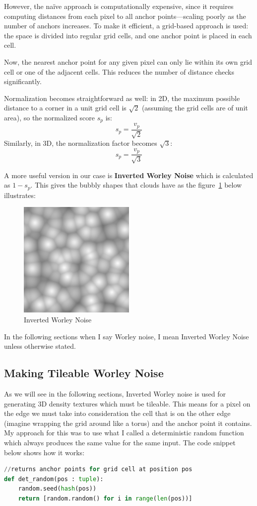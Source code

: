 However, the naïve approach is computationally expensive, since it requires computing distances from each pixel to all anchor points—scaling poorly as the number of anchors increases. To make it efficient, a grid-based approach is used: the space is divided into regular grid cells, and one anchor point is placed in each cell.

Now, the nearest anchor point for any given pixel can only lie within its own grid cell or one of the adjacent cells. This reduces the number of distance checks significantly.

Normalization becomes straightforward as well: in 2D, the maximum possible distance to a corner in a unit grid cell is $\sqrt{2}$ (assuming the grid cells are of unit area), so the normalized score $s_p$ is:
\[
s_p = \frac{v_p}{\sqrt{2}}
\]
Similarly, in 3D, the normalization factor becomes $\sqrt{3}$:
\[
s_p = \frac{v_p}{\sqrt{3}}
\]

A more useful version in our case is \textbf{Inverted Worley Noise} which is calculated as $1 - s_p$. This gives the bubbly shapes that clouds have as the figure~\ref{fig:inverted_worley} below illustrates:
\begin{figure}[H]
    \centering
    \includegraphics[width=0.5\textwidth]{images/inverted_worley.png}
    \caption{Inverted Worley Noise}
    \label{fig:inverted_worley}
\end{figure}

In the following sections when I say Worley noise, I mean Inverted Worley Noise unless otherwise stated.

\subsection{Making Tileable Worley Noise}
As we will see in the following sections, Inverted Worley noise is used for generating 3D density textures which must be tileable. This means for a pixel on the edge we must take into consideration the cell that is on the other edge (imagine wrapping the grid around like a torus) and the anchor point it contains. My approach for this was to use what I called a deterministic random function which always produces the same value for the same input. The code snippet below shows how it works:
\begin{lstlisting}[language=Python]
//returns anchor points for grid cell at position pos
def det_random(pos : tuple):
	random.seed(hash(pos))
	return [random.random() for i in range(len(pos))]
\end{lstlisting}

